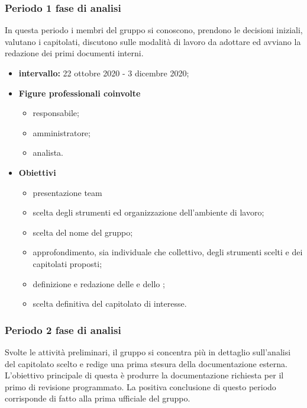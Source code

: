 
        \subsubsection{Periodo 1 fase di analisi}
    In questa periodo i membri del gruppo si conoscono, prendono le decisioni iniziali, valutano i capitolati, discutono sulle modalità di lavoro da adottare ed avviano la redazione dei primi documenti interni.
        \begin{itemize}
            \item \textbf{intervallo: }22 ottobre 2020 - 3 dicembre 2020;
            \item  \textbf{Figure professionali coinvolte}
                    \begin{itemize}
                        \item responsabile;
                        \item amministratore;
                        \item analista.
                    \end{itemize}
            \item \textbf{Obiettivi}
            \begin{itemize}
                \item presentazione team
                \item scelta degli strumenti ed organizzazione dell'ambiente di lavoro;
                \item scelta del nome del gruppo;
                \item approfondimento, sia individuale che collettivo, degli strumenti scelti e dei capitolati proposti;
                \item definizione e redazione delle \NdP{} e dello \glo{\SdF{}};
                \item scelta definitiva del capitolato di interesse.
            \end{itemize}
        \end{itemize}
        
        \subsubsection{Periodo 2 fase di analisi}
        Svolte le attività preliminari, il gruppo si concentra più in dettaglio sull'analisi del capitolato scelto e redige una prima stesura della documentazione esterna. 
        L'obiettivo principale di questa  è produrre la documentazione richiesta per il primo  
        di revisione programmato. La positiva conclusione di questo periodo corrisponde di fatto alla prima  ufficiale del gruppo.
        
